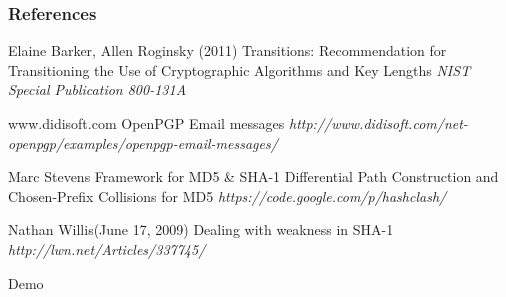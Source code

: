 \documentclass{beamer}
\begin{document}

\begin{frame}
\frametitle{References}
\footnotesize{
\begin{thebibliography}{99} 

 Elaine Barker, Allen Roginsky (2011)
\newblock Transitions: Recommendation for Transitioning the Use of Cryptographic Algorithms and Key Lengths
\newblock \emph{NIST Special Publication 800-131A}

 www.didisoft.com
\newblock OpenPGP Email messages
\newblock \emph{http://www.didisoft.com/net-openpgp/examples/openpgp-email-messages/}

 Marc Stevens
\newblock Framework for MD5 \& SHA-1 Differential Path Construction and Chosen-Prefix Collisions for MD5
\newblock \emph{https://code.google.com/p/hashclash/}

 Nathan Willis(June 17, 2009)
\newblock Dealing with weakness in SHA-1
\newblock \emph{http://lwn.net/Articles/337745/}

\end{thebibliography}
}
\end{frame}


\begin{frame}
\Huge{\centerline{Demo}}
\end{frame}

\end{document}
